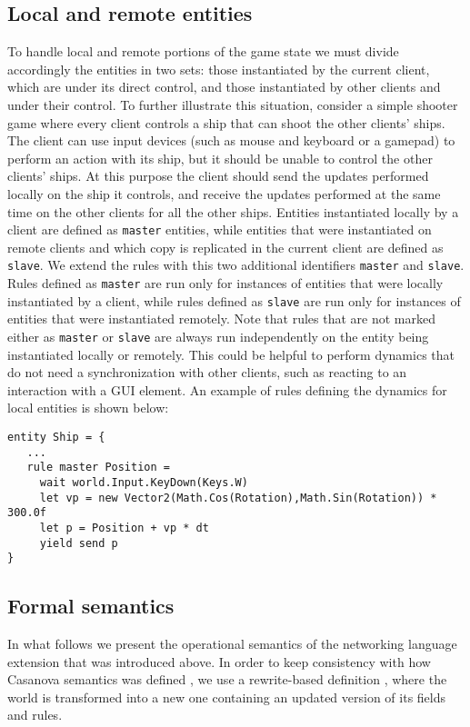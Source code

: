\subsection{Local and remote entities}
To handle local and remote portions of the game state we must divide accordingly the entities in two sets: those instantiated by the current client, which are under its direct control, and those instantiated by other clients and under their control. To further illustrate this situation, consider a simple shooter game where every client controls a ship that can shoot the other clients' ships. The client can use input devices (such as mouse and keyboard or a gamepad) to perform an action with its ship, but it should be unable to control the other clients' ships. At this purpose the client should send the updates performed locally on the ship it controls, and receive the updates performed at the same time on the other clients for all the other ships. Entities instantiated locally by a client are defined as \texttt{master} entities, while entities that were instantiated on remote clients and which copy is replicated in the current client are defined as \texttt{slave}. We extend the rules with this two additional identifiers \texttt{master} and \texttt{slave}. Rules defined as \texttt{master} are run only for instances of entities that were locally instantiated by a client, while rules defined as \texttt{slave} are run only for instances of entities that were instantiated remotely. Note that rules that are not marked either as \texttt{master} or \texttt{slave} are always run independently on the entity being instantiated locally or remotely. This could be helpful to perform dynamics that do not need a synchronization with other clients, such as reacting to an interaction with a GUI element. An example of rules defining the dynamics for local entities is shown below:

\begin{lstlisting}
entity Ship = {
   ...
   rule master Position =
     wait world.Input.KeyDown(Keys.W)
     let vp = new Vector2(Math.Cos(Rotation),Math.Sin(Rotation)) * 300.0f
     let p = Position + vp * dt
     yield send p     
}
\end{lstlisting}

\subsection{Formal semantics}
In what follows we present the operational semantics of the networking language extension that was introduced above. In order to keep consistency with how Casanova semantics was defined \cite{Abbadi2015}, we use a rewrite-based definition \cite{klop1992term}, where the world is transformed into a new one containing an updated version of its fields and rules.

